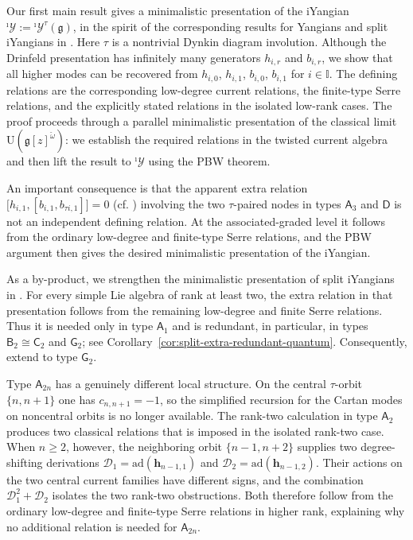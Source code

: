 \documentclass[11pt,reqno]{amsart}
\numberwithin{equation}{section}
\theoremstyle{definition}
\theoremstyle{remark}
\newcommand{\cD}{\mathcal{D}}
\newcommand{\bh}{\mathbf{h}}
\newcommand{\g}{\mathfrak{g}}
\newcommand{\gge}{\geqslant}
\newcommand{\I}{{\mathbb I}}
\newcommand{\Yi}{{^\imath\mathscr{Y}}}
\newcommand{\ad}{\mathrm{ad}}
\begin{document}
Our first main result gives a minimalistic presentation of the iYangian $\Yi:=\Yi^\tau(\g)$, in the spirit of the corresponding results for Yangians and split iYangians in \cite{Lev93gen,GNW18,Lu26min}. Here $\tau$ is a nontrivial Dynkin diagram involution. Although the Drinfeld presentation has infinitely many generators $h_{i,r}$ and $b_{i,r}$, we show that all higher modes can be recovered from $h_{i,0}$, $h_{i,1}$, $b_{i,0}$, $b_{i,1}$ for $i\in \I$. The defining relations are the corresponding low-degree current relations, the finite-type Serre relations, and the explicitly stated relations in the isolated low-rank cases. The proof proceeds through a parallel minimalistic presentation of the classical limit $\mathrm U(\g[z]^{\check\omega})$: we establish the required relations in the twisted current algebra and then lift the result to $\Yi$ using the PBW theorem.

An important consequence is that the apparent extra relation $\big[h_{i,1},[b_{i,1},b_{\tau i,1}]\big]=0$ (cf. \cite[(1.6)]{Lev93gen}) involving the two $\tau$-paired nodes in types $\mathsf A_3$ and $\mathsf D$ is not an independent defining relation. At the associated-graded level it follows from the ordinary low-degree and finite-type Serre relations, and the PBW argument then gives the desired minimalistic presentation of the iYangian.

As a by-product, we strengthen the
minimalistic presentation of split iYangians in \cite[Theorem~3.1]{Lu26min}. For
every simple Lie algebra of rank at least two, the extra relation \cite[(3.4)]{Lu26min} in
that presentation follows from the remaining low-degree and finite
Serre relations. Thus it is needed only in type $\mathsf A_1$ and is
redundant, in particular, in types $\mathsf B_2\cong\mathsf C_2$ and
$\mathsf G_2$; see Corollary~\ref{cor:split-extra-redundant-quantum}. Consequently, \cite[Theorems~4.1 and~5.1]{Lu26min} extend to type $\mathsf G_2$.

Type $\mathsf A_{2n}$ has a genuinely different local structure. On the central $\tau$-orbit $\{n,n+1\}$ one has $c_{n,n+1}=-1$, so the simplified recursion for the Cartan modes on noncentral orbits is no longer available. The rank-two calculation in type $\mathsf A_2$ produces two classical relations that is imposed in the isolated rank-two case. When $n\gge2$, however, the neighboring orbit $\{n-1,n+2\}$ supplies two degree-shifting derivations $\cD_1=\ad(\bh_{n-1,1})$ and $\cD_2=\ad(\bh_{n-1,2})$. Their actions on the two central current families have different signs, and the combination $\cD_1^2+\cD_2$ isolates the two rank-two obstructions. Both therefore follow from the ordinary low-degree and finite-type Serre relations in higher rank, explaining why no additional relation is needed for $\mathsf A_{2n}$.
\end{document}
